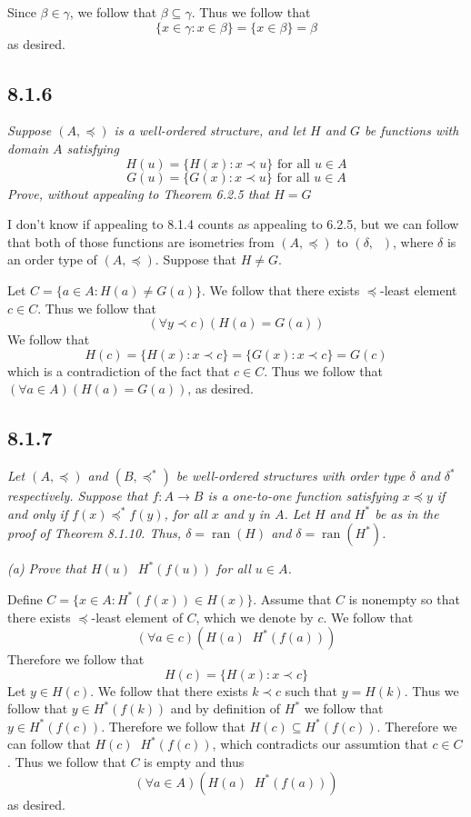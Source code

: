 \documentclass[11pt,oneside,titlepage]{book}
\DeclareMathOperator \ran {ran}
\DeclareMathOperator \ineq {\underline{\in}}
\newcommand{\set}[1]{\{ #1 \}}
\begin{document}
Since $\beta \in \gamma$, we follow that $\beta \subseteq \gamma$. Thus we follow that
$$\set{x \in \gamma: x \in \beta} = \set{x \in \beta} = \beta$$
as desired.

\subsection*{8.1.6}

\textit{Suppose $(A, \preceq)$ is a well-ordered structure, and let $H$ and $G$ be
  functions with domain $A$ satisfying
  $$H(u) = \set{H(x): x \prec u} \text{ for all } u \in A$$
  $$G(u) = \set{G(x): x \prec u} \text{ for all } u \in A$$
  Prove, without appealing to Theorem 6.2.5 that $H = G$
}

I don't know if appealing to 8.1.4 counts as appealing to 6.2.5, but we can follow that
both of those functions are isometries from $(A, \preceq)$ to $(\delta, \ineq)$,
where $\delta$ is an order type of $(A, \preceq)$. Suppose that $H \neq G$.

Let $C = \set{a \in A: H(a) \neq G(a)}$. We follow that there exists $\preceq$-least element
$c \in C$. Thus we follow that
$$(\forall y \prec c)(H(a) = G(a))$$
We follow that
$$H(c) = \set{H(x): x \prec c} = \set{G(x): x \prec c} = G(c)$$
which is a contradiction of the fact that $c \in C$. Thus we follow that
$(\forall a \in A)(H(a) = G(a))$, as desired.

\subsection*{8.1.7}

\textit{Let $(A, \preceq)$ and $(B, \preceq^*)$ be well-ordered structures with order type
  $\delta$ and $\delta^*$ respectively. Suppose that $f: A \to B$ is a one-to-one
  function satisfying $x \preceq y$ if and only if $f(x) \preceq^* f(y)$, for all
  $x$ and $y$ in $A$. Let $H$ and $H^*$ be as in the proof of Theorem 8.1.10. Thus,
  $\delta = \ran(H)$ and $\delta = \ran(H^*)$.}

\textit{(a) Prove that $H(u) \ineq H^*(f(u))$ for all $u \in A$.}

Define $C = \set{x \in A: H^*(f(x)) \in H(x)}$. Assume that $C$ is
nonempty so that there exists
$\preceq$-least element of $C$, which we denote by $c$. We follow that
$$(\forall a \in c)(H(a) \ineq H^*(f(a)))$$
Therefore we follow that
$$H(c) = \set{H(x): x \prec c}$$
Let $y \in H(c)$. We follow that there exists $k \prec c$ such that $y = H(k)$. Thus
we follow that $y \in H^*(f(k))$ and by definition of $H^*$ we follow that $y \in H^*(f(c))$.
Therefore we follow that $H(c) \subseteq H^*(f(c))$.
Therefore we can follow that $H(c) \ineq H^*(f(c))$, which contradicts our assumtion
that $c \in C$. Thus we follow that $C$ is empty and thus
$$(\forall a \in A)(H(a) \ineq H^*(f(a)))$$
as desired.
\end{document}

